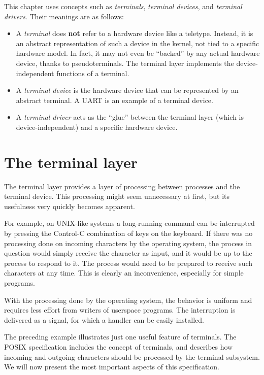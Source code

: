 \documentclass[shortabstract, manyadvisors, english, mgr]{iithesis}
\begin{document}
This chapter uses concepts such as \textit{terminals}, \textit{terminal
  devices}, and \textit{terminal drivers}. Their meanings are as follows:
\begin{itemize}
\item A \textit{terminal} does \textbf{not} refer to a hardware device like a
  teletype. Instead, it is an abstract representation of such a device in the
  kernel, not tied to a specific hardware model. In fact, it may not even be
  ``backed'' by any actual hardware device, thanks to pseudoterminals. The
  terminal layer implements the device-independent functions of a terminal.
\item A \textit{terminal device} is the hardware device that can be represented
  by an abstract terminal. A UART is an example of a terminal device.
\item A \textit{terminal driver} acts as the ``glue'' between the terminal layer
  (which is device-independent) and a specific hardware device.
\end{itemize}

\section{The terminal layer}

The terminal layer provides a layer of processing between processes and the
terminal device. This processing might seem unnecessary at first, but its
usefulness very quickly becomes apparent.

For example, on UNIX-like systems a long-running command can be interrupted by
pressing the Control-C combination of keys on the keyboard. If there was no
processing done on incoming characters by the operating system, the process in
question would simply receive the character as input, and it would be up to the
process to respond to it. The process would need to be prepared to receive such
characters at any time. This is clearly an inconvenience, especially for simple
programs.

With the processing done by the operating system, the behavior is uniform and
requires less effort from writers of userspace programs. The interruption is
delivered as a signal, for which a handler can be easily installed.

The preceding example illustrates just one useful feature of terminals. 
The POSIX specification includes the concept of terminals, and describes how
incoming and outgoing characters should be processed by the terminal subsystem. 
We will now present the most important aspects of this specification.
\end{document}
